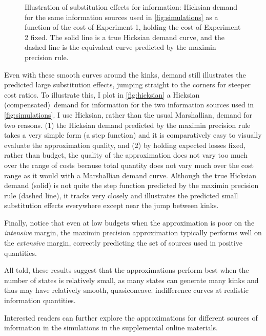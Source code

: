\documentclass{fancyArticle}
\renewcommand{\|}{\,|\,}                    %
\providecommand{\;}{\,;}                    %
\begin{document}
\begin{figure}[t]
\begin{minipage}{0.45\linewidth}
  \end{minipage}
  \caption{Illustration of substitution effects for information: Hicksian demand for the same information sources used in \autoref{fig:simulations} as a function of the cost of Experiment 1, holding the cost of Experiment 2 fixed. The solid line is a true Hicksian demand curve, and the dashed line is the equivalent curve predicted by the maximin precision rule.}
  \label{fig:hicksian}
\end{figure}

Even with these smooth curves around the kinks, demand still illustrates the predicted large substitution effects, jumping straight to the corners for steeper cost ratios.
To illustrate this, I plot in \autoref{fig:hicksian} a Hicksian (compensated)\footnotemark\ demand for information for the two information sources used in \autoref{fig:simulations}.
I use Hicksian, rather than the usual Marshallian, demand for two reasons. (1) the Hicksian demand predicted by the maximin precision rule takes a very simple form (a step function) and it is comparatively easy to visually evaluate the approximation quality,
and (2) by holding expected losses fixed, rather than budget, the quality of the approximation does not vary too much over the range of costs because total quantity does not vary much over the cost range as it would with a Marshallian demand curve.
Although the true Hicksian demand (solid) is not quite the step function predicted by the maximin precision rule (dashed line), it tracks very closely and illustrates the predicted small substitution effects everywhere except near the jump between kinks.

Finally, notice that even at low budgets when the approximation is poor on the \textit{intensive} margin, the maximin precision approximation typically performs well on the \textit{extensive} margin, correctly predicting the set of sources used in positive quantities.

All told, these results suggest that the approximations perform best when the number of states is relatively small, as many states can generate many kinks and thus may have relatively smooth, quasiconcave. indifference curves at realistic information quantities.

Interested readers can further explore the approximations for different sources of information in the simulations in the supplemental online materials.\footnotemark
{}
\end{document}
